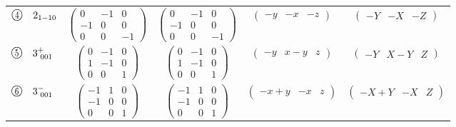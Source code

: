 \documentclass[fleqn,10pt,landscape]{jsarticle}
\begin{document}
\begin{center}
\begin{longtable}{lcccc}
$ {\ooalign{\hfil\resizebox{.8\width}{\height}{4}\hfil\crcr\raise.1ex\hbox{\large$\bigcirc$}}}\quad 2{}_{1-10} $ & $ \begin{pmatrix} 0 & -1 & 0 \\ -1 & 0 & 0 \\ 0 & 0 & -1 \end{pmatrix} $ & $ \begin{pmatrix} 0 & -1 & 0 \\ -1 & 0 & 0 \\ 0 & 0 & -1 \end{pmatrix} $ & $ \begin{pmatrix} - y & - x & - z \end{pmatrix} $ & $ \begin{pmatrix} - Y & - X & - Z \end{pmatrix} $ \\
$ {\ooalign{\hfil\resizebox{.8\width}{\height}{5}\hfil\crcr\raise.1ex\hbox{\large$\bigcirc$}}}\quad 3^{+}_{\,\,001} $ & $ \begin{pmatrix} 0 & -1 & 0 \\ 1 & -1 & 0 \\ 0 & 0 & 1 \end{pmatrix} $ & $ \begin{pmatrix} 0 & -1 & 0 \\ 1 & -1 & 0 \\ 0 & 0 & 1 \end{pmatrix} $ & $ \begin{pmatrix} - y & x - y & z \end{pmatrix} $ & $ \begin{pmatrix} - Y & X - Y & Z \end{pmatrix} $ \\
$ {\ooalign{\hfil\resizebox{.8\width}{\height}{6}\hfil\crcr\raise.1ex\hbox{\large$\bigcirc$}}}\quad 3^{-}_{\,\,001} $ & $ \begin{pmatrix} -1 & 1 & 0 \\ -1 & 0 & 0 \\ 0 & 0 & 1 \end{pmatrix} $ & $ \begin{pmatrix} -1 & 1 & 0 \\ -1 & 0 & 0 \\ 0 & 0 & 1 \end{pmatrix} $ & $ \begin{pmatrix} - x + y & - x & z \end{pmatrix} $ & $ \begin{pmatrix} - X + Y & - X & Z \end{pmatrix} $ \\
\end{longtable}
\end{center}
\end{document}
